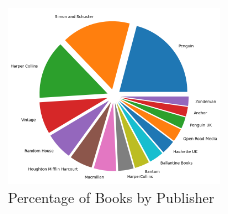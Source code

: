 \documentclass[12pt]{article}
\numberwithin{equation}{section}
\begin{document}
\begin{figure}
    \centering
    \includegraphics[width = 0.5\textwidth]{publisher_counts.png}
\caption{Percentage of Books by Publisher} 
\end{figure}

\vspace{1em} 


%
%

\newpage
\printbibliography[heading=bibintoc]
\end{document}
